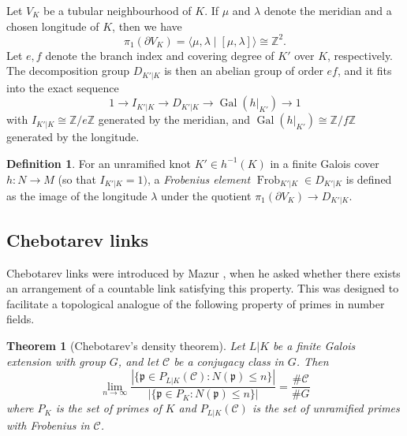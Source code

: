 \documentclass{amsart}
\theoremstyle{plain}
\theoremstyle{definition}
\newtheorem{Def}[theorem]{Definition}
\theoremstyle{plain}
\theoremstyle{plain}
\theoremstyle{plain}
\theoremstyle{remark}
\theoremstyle{remark}
\theoremstyle{plain}
\theoremstyle{definition}
\theoremstyle{plain}
\DeclareMathOperator{\Gal}{\mathrm{Gal}}
\DeclareMathOperator{\Frob}{\mathrm{Frob}}
\theoremstyle{plain}
\theoremstyle{plain}
\newtheorem*{theorem*}{Theorem}
\numberwithin{equation}{section}
\begin{document}
Let $V_K$ be a tubular neighbourhood of $K$. If $\mu$ and $\lambda$ denote the meridian and a chosen longitude of $K$, then we have \[\pi_1(\partial V_K) = \langle \mu, \lambda \mid [\mu, \lambda] \rangle \cong \mathbb{Z}^2.\]
Let $e, f$ denote the branch index and covering degree of $K'$ over $K$, respectively. The decomposition group $D_{K'|K}$ is then an abelian group of order $ef$, and it fits into the exact sequence
\begin{equation}
    1 \to I_{K'|K} \to D_{K'|K} \to \Gal(h|_{K'}) \to 1
\end{equation}
with $I_{K'|K} \cong \mathbb Z / e\mathbb Z$ generated by the meridian, and $\Gal(h|_{K'}) \cong \mathbb Z/f\mathbb Z$ generated by the longitude.

\begin{Def}\label{def:frob}
For an unramified knot $K' \in h^{-1}(K)$ in a finite Galois cover $h: N \to M$ (so that $I_{K'|K} = 1)$, a \emph{Frobenius element} $\Frob_{K'|K} \in D_{K'|K}$ is defined as the image of the longitude $\lambda$ under the quotient $\pi_1(\partial V_K) \to D_{K'|K}$. 
\end{Def}

\subsection{Chebotarev links}\label{sec:chebo}

Chebotarev links were introduced by Mazur \cite{mazur}, when he asked whether there exists an arrangement of a countable link satisfying this property. This was designed to facilitate a topological analogue of the following property of primes in number fields. 

\begin{theorem*}[Chebotarev's density theorem]
Let $L|K$ be a finite Galois extension with group $G$, and let $\mathcal{C}$ be a conjugacy class in $G$. Then 
\begin{equation}
    \lim_{n \to \infty} \frac{|\{\mathfrak{p}\in P_{L|K}(\mathcal{C}):N(\mathfrak{p})\leq n\}|}{|\{\mathfrak{p}\in P_{K}:N(\mathfrak{p})\leq n\}|} = \frac{\#\mathcal{C}}{\#G}
\end{equation}
where $P_K$ is the set of primes of $K$ and $P_{L|K}(\mathcal C)$ is the set of unramified primes with Frobenius in $\mathcal C$.
\end{theorem*}
\end{document}
